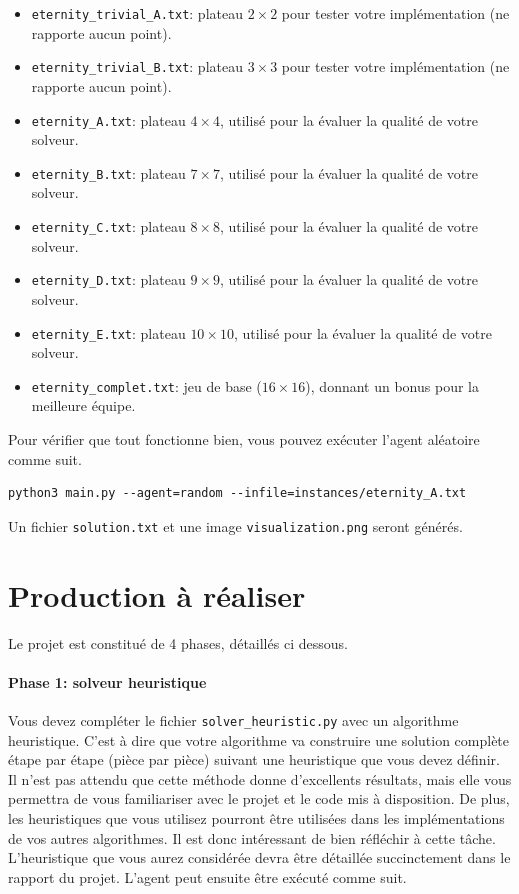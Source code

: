\documentclass[a4paper,11pt,final,fleqn]{article}
\begin{document}
\begin{itemize}
\item \texttt{eternity\_trivial\_A.txt}: plateau $2 \times 2$ pour tester votre implémentation (ne rapporte aucun point).
\item \texttt{eternity\_trivial\_B.txt}: plateau $3 \times 3$ pour tester  votre implémentation (ne rapporte aucun point).
\item \texttt{eternity\_A.txt}: plateau $4 \times 4$, utilisé pour la évaluer la qualité de votre solveur.
\item \texttt{eternity\_B.txt}: plateau $7 \times 7$, utilisé pour la évaluer la qualité de votre solveur.
\item \texttt{eternity\_C.txt}: plateau $8 \times 8$, utilisé pour la évaluer la qualité de votre solveur.
\item \texttt{eternity\_D.txt}: plateau $9 \times 9$, utilisé pour la évaluer la qualité de votre solveur.
\item \texttt{eternity\_E.txt}: plateau $10 \times 10$, utilisé pour la évaluer la qualité de votre solveur.
\item \texttt{eternity\_complet.txt}: jeu de base ($16 \times 16$), donnant un bonus pour la meilleure équipe.
\end{itemize}

Pour vérifier que tout fonctionne bien, vous pouvez exécuter l'agent aléatoire comme suit.

\begin{lstlisting}
python3 main.py --agent=random --infile=instances/eternity_A.txt 
\end{lstlisting}

Un fichier \texttt{solution.txt} et une image \texttt{visualization.png} seront générés.

\section*{Production à réaliser}

Le projet est constitué de 4 phases, détaillés ci dessous.

\paragraph{Phase 1: solveur heuristique} Vous devez compléter le fichier \texttt{solver\_heuristic.py} avec un algorithme heuristique. 
C'est à dire que votre algorithme va construire une solution complète étape par étape (pièce par pièce) suivant une heuristique que vous devez définir.
Il n'est pas attendu que cette méthode donne d'excellents résultats, mais elle vous permettra de vous familiariser avec le projet et le code mis à disposition. De plus, les heuristiques que vous utilisez pourront être utilisées dans les implémentations de vos autres algorithmes. 
Il est donc intéressant de bien réfléchir à cette tâche. L'heuristique que vous aurez considérée devra être détaillée succinctement dans le rapport du projet. L'agent peut ensuite être exécuté comme suit.
\end{document}
